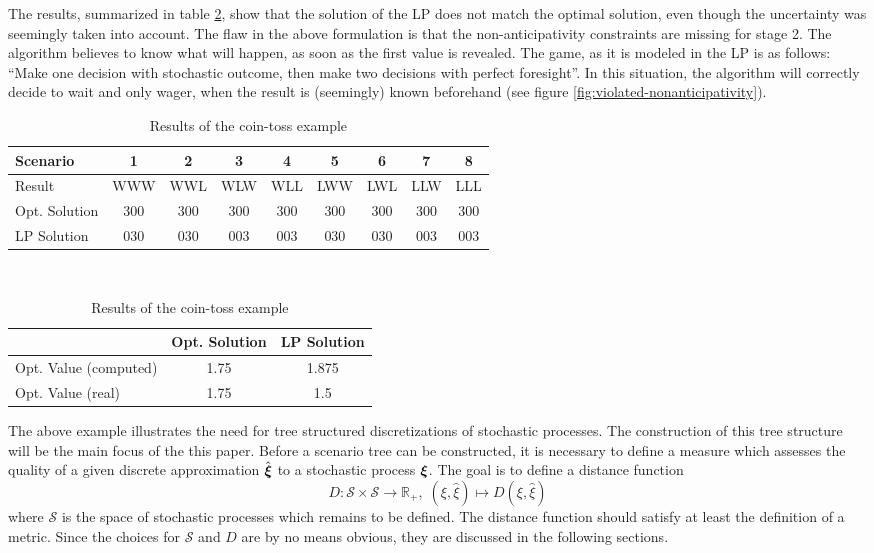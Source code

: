 \begin{example}
  The results, summarized in table \ref{tab:coin-toss-results}, show that the solution of the LP does not match the optimal solution, even though the uncertainty was seemingly taken into account. 
  The flaw in the above formulation is that the non-anticipativity constraints are missing for stage 2. 
  The algorithm believes to know what will happen, as soon as the first value is revealed. 
  The game, as it is modeled in the LP is as follows: 
  ``Make one decision with stochastic outcome, then make two decisions with perfect foresight''. 
  In this situation, the algorithm will correctly decide to wait and only wager, when the result is (seemingly) known beforehand (see figure \ref{fig:violated-nonanticipativity}). 
  
  \begin{table}
    \small\centering
    \begin{tabular}{lcccccccc}
      \hline 
      Scenario&1&2&3&4&5&6&7&8\\\hline\hline
      Result&WWW&WWL&WLW&WLL&LWW&LWL&LLW&LLL\\
      Opt. Solution&300&300&300&300&300&300&300&300\\
      LP Solution&030&030&003&003&030&030&003&003\\\hline
    \end{tabular}
    \vspace*{0.5cm}\\
    \begin{tabular}{lcc}
      \hline
      &Opt. Solution&LP Solution\\\hline\hline
      Opt. Value (computed)&1.75&1.875\\
      Opt. Value (real)&1.75&1.5\\
      \hline
    \end{tabular}
    \caption{Results of the coin-toss example}
    \label{tab:coin-toss-results}
  \end{table}
\end{example}

The above example illustrates the need for tree structured discretizations of stochastic processes. The construction of this tree structure will be the main focus of the this paper. Before a scenario tree can be constructed, it is necessary to define a measure which assesses the quality of a given discrete approximation $\hat{\boldsymbol\xi}$ to a stochastic process $\boldsymbol\xi$. The goal is to define a distance function 
\begin{equation}
  \label{eq:distance-function-intro}
  D:\mathcal{S} \times \mathcal{S} \rightarrow \mathbb{R}_+,\;(\xi, \hat{\xi})\mapsto D(\xi, \hat{\xi})
\end{equation}
where $\mathcal{S}$ is the space of stochastic processes which remains to be defined. The distance function should satisfy at least the definition of a metric. Since the choices for $\mathcal{S}$ and $D$ are by no means obvious, they are discussed in the following sections.
